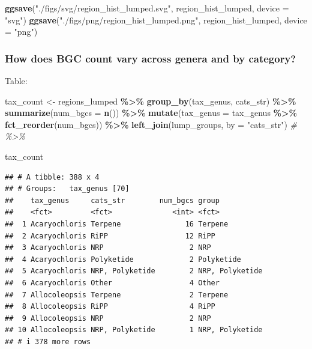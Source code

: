 \documentclass[
]{article}
\newenvironment{Shaded}{\begin{snugshade}}{\end{snugshade}}
\newcommand{\AttributeTok}[1]{\textcolor[rgb]{0.13,0.29,0.53}{#1}}
\newcommand{\CommentTok}[1]{\textcolor[rgb]{0.56,0.35,0.01}{\textit{#1}}}
\newcommand{\FunctionTok}[1]{\textcolor[rgb]{0.13,0.29,0.53}{\textbf{#1}}}
\newcommand{\NormalTok}[1]{#1}
\newcommand{\OtherTok}[1]{\textcolor[rgb]{0.56,0.35,0.01}{#1}}
\newcommand{\SpecialCharTok}[1]{\textcolor[rgb]{0.81,0.36,0.00}{\textbf{#1}}}
\newcommand{\StringTok}[1]{\textcolor[rgb]{0.31,0.60,0.02}{#1}}
\begin{document}
\begin{Shaded}
\begin{Highlighting}[]
\FunctionTok{ggsave}\NormalTok{(}\StringTok{"./figs/svg/region\_hist\_lumped.svg"}\NormalTok{, region\_hist\_lumped, }\AttributeTok{device =} \StringTok{"svg"}\NormalTok{)}
\FunctionTok{ggsave}\NormalTok{(}\StringTok{"./figs/png/region\_hist\_lumped.png"}\NormalTok{, region\_hist\_lumped, }\AttributeTok{device =} \StringTok{"png"}\NormalTok{)}
\end{Highlighting}
\end{Shaded}

\hypertarget{how-does-bgc-count-vary-across-genera-and-by-category}{%
\subsubsection{How does BGC count vary across genera and by
category?}\label{how-does-bgc-count-vary-across-genera-and-by-category}}

Table:

\begin{Shaded}
\begin{Highlighting}[]
\NormalTok{tax\_count }\OtherTok{\textless{}{-}}\NormalTok{ regions\_lumped }\SpecialCharTok{\%\textgreater{}\%}
  \FunctionTok{group\_by}\NormalTok{(tax\_genus, cats\_str) }\SpecialCharTok{\%\textgreater{}\%}
  \FunctionTok{summarize}\NormalTok{(}\AttributeTok{num\_bgcs =} \FunctionTok{n}\NormalTok{()) }\SpecialCharTok{\%\textgreater{}\%}
  \FunctionTok{mutate}\NormalTok{(}\AttributeTok{tax\_genus =}\NormalTok{ tax\_genus }\SpecialCharTok{\%\textgreater{}\%} \FunctionTok{fct\_reorder}\NormalTok{(num\_bgcs)) }\SpecialCharTok{\%\textgreater{}\%}
  \FunctionTok{left\_join}\NormalTok{(lump\_groups, }\AttributeTok{by =} \StringTok{"cats\_str"}\NormalTok{) }\CommentTok{\# \%\textgreater{}\%}

\NormalTok{tax\_count}
\end{Highlighting}
\end{Shaded}

\begin{verbatim}
## # A tibble: 388 x 4
## # Groups:   tax_genus [70]
##    tax_genus     cats_str        num_bgcs group          
##    <fct>         <fct>              <int> <fct>          
##  1 Acaryochloris Terpene               16 Terpene        
##  2 Acaryochloris RiPP                  12 RiPP           
##  3 Acaryochloris NRP                    2 NRP            
##  4 Acaryochloris Polyketide             2 Polyketide     
##  5 Acaryochloris NRP, Polyketide        2 NRP, Polyketide
##  6 Acaryochloris Other                  4 Other          
##  7 Allocoleopsis Terpene                2 Terpene        
##  8 Allocoleopsis RiPP                   4 RiPP           
##  9 Allocoleopsis NRP                    2 NRP            
## 10 Allocoleopsis NRP, Polyketide        1 NRP, Polyketide
## # i 378 more rows
\end{verbatim}
\end{document}
